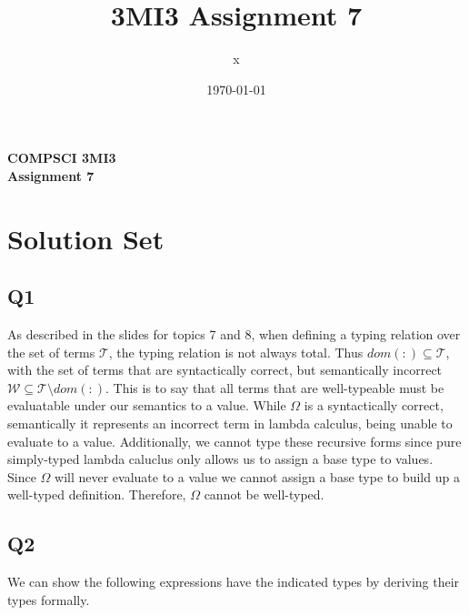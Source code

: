 \documentclass[12pt, fleqn]{article}
\title{3MI3 Assignment 7}
\author{x}
\date{\today}
\begin{document}
\begin{center}

    {\large \textbf{COMPSCI 3MI3}}\\[8mm]
    {\huge \textbf{Assignment 7}}\\[6mm]

\end{center}

\medskip

\section{Solution Set}

\subsection{Q1}

As described in the slides for topics 7 and 8, when defining a typing relation over the set of terms $\mathcal{T}$,
the typing relation is not always total. Thus $dom(:) \subseteq \mathcal{T}$, with the set of terms that are syntactically
correct, but semantically incorrect $\mathcal{W} \subseteq \mathcal{T} \setminus dom(:)$. This is to say that all
terms that are well-typeable must be evaluatable under our semantics to a value. While $\Omega$ is a 
syntactically correct, semantically it represents an incorrect term in lambda calculus, being unable to evaluate to a value.
Additionally, we cannot type these recursive forms since pure simply-typed lambda caluclus only
allows us to assign a base type to values. Since $\Omega$ will never evaluate to a value we cannot
assign a base type to build up a well-typed definition.
Therefore, $\Omega$ cannot be well-typed.

\subsection{Q2}
We can show the following expressions have the indicated types by deriving their types formally.
\end{document}
